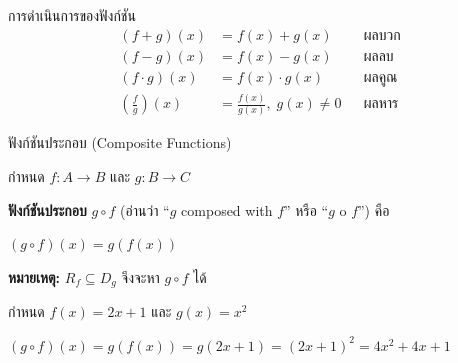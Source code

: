 \documentclass[11pt, aspectratio=169]{beamer}
\begin{document}
\begin{frame}{การดำเนินการของฟังก์ชัน}
  \begin{align*}
    (f + g)(x) &= f(x) + g(x) &&\text{ผลบวก} \\
    (f - g)(x) &= f(x) - g(x) &&\text{ผลลบ} \\
    (f \cdot g)(x) &= f(x) \cdot g(x) &&\text{ผลคูณ} \\
    \left(\frac{f}{g}\right)(x) &= \frac{f(x)}{g(x)}, \; g(x) \neq 0 &&\text{ผลหาร}
  \end{align*}
\end{frame}\begin{frame}{ฟังก์ชันประกอบ (Composite Functions)}
  \begin{explanation}[นิยาม]
    กำหนด $f: A \to B$ และ $g: B \to C$

    \medskip
    \textbf{ฟังก์ชันประกอบ} $g \circ f$ (อ่านว่า ``$g$ composed with $f$'' หรือ ``$g$ o $f$'') คือ

    \medskip
    $(g \circ f)(x) = g(f(x))$

    \medskip
    \textbf{หมายเหตุ:} $R_f \subseteq D_g$ จึงจะหา $g \circ f$ ได้
  \end{explanation}

  \begin{exambox}[ตัวอย่าง]
    กำหนด $f(x) = 2x + 1$ และ $g(x) = x^2$

    \medskip
    $(g \circ f)(x) = g(f(x)) = g(2x + 1) = (2x + 1)^2 = 4x^2 + 4x + 1$


\end{exambox}
\end{frame}
\end{document}
